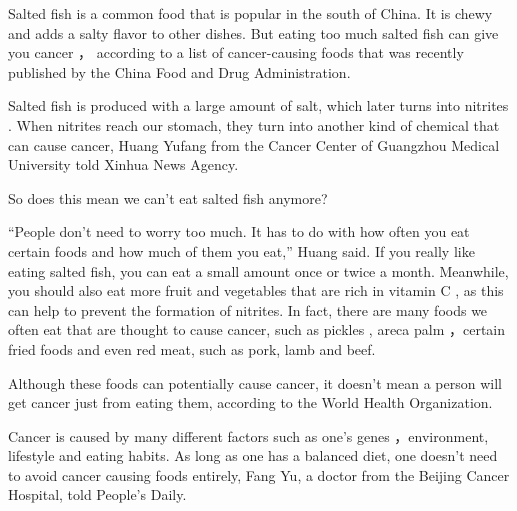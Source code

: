 \documentclass{ExamJHSEngl}
\begin{document}

Salted fish is a common food that is popular in the south of China. It is chewy  and adds a salty flavor to other dishes. But eating too much salted fish can give you cancer  ， according to a list of cancer-causing foods that was recently published by the China Food and Drug Administration.

Salted fish is produced with a large amount of salt, which later turns into nitrites  . When nitrites reach our stomach, they turn into another kind of chemical that can cause cancer, Huang Yufang from the Cancer Center of Guangzhou Medical University told Xinhua News Agency.

So does this mean we can't eat salted fish anymore?

“People don't need to worry too much. It has to do with how often you eat certain foods and how much of them you eat,” Huang said. If you really like eating salted fish, you can eat a small amount once or twice a month. Meanwhile, you should also eat more fruit and vegetables that are rich in vitamin C  , as this can help to prevent the formation of nitrites. In fact, there are many foods we often eat that are thought to cause cancer, such as pickles  , areca palm  ，certain fried foods and even red meat, such as pork, lamb and beef.

Although these foods can potentially cause cancer, it doesn't mean a person will get cancer just from eating them, according to the World Health Organization.

Cancer is caused by many different factors such as one's genes  ，environment, lifestyle and eating habits. As long as one has a balanced diet, one doesn't need to avoid cancer causing foods entirely, Fang Yu, a doctor from the Beijing Cancer Hospital, told People's Daily.
\end{document}
